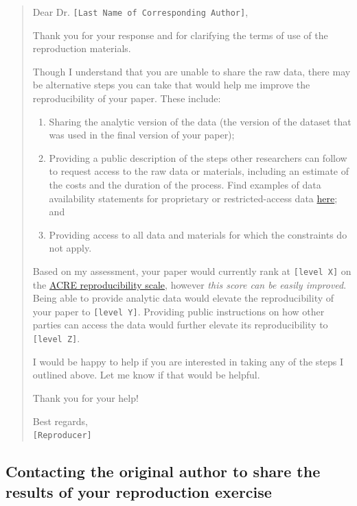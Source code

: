 \documentclass[]{book}
\providecommand{\tightlist}{%
  \setlength{\itemsep}{0pt}\setlength{\parskip}{0pt}}
\begin{document}
\begin{quote}
Dear Dr. \texttt{{[}Last\ Name\ of\ Corresponding\ Author{]}},

Thank you for your response and for clarifying the terms of use of the reproduction materials.

Though I understand that you are unable to share the raw data, there may be alternative steps you can take that would help me improve the reproducibility of your paper. These include:

\begin{enumerate}
\def\labelenumi{\arabic{enumi}.}
\tightlist
\item
  Sharing the analytic version of the data (the version of the dataset that was used in the final version of your paper);\\
\item
  Providing a public description of the steps other researchers can follow to request access to the raw data or materials, including an estimate of the costs and the duration of the process. Find examples of data availability statements for proprietary or restricted-access data \href{https://social-science-data-editors.github.io/guidance/Requested_information_dcas.html}{here}; and\\
\item
  Providing access to all data and materials for which the constraints do not apply.
\end{enumerate}

Based on my assessment, your paper would currently rank at \texttt{{[}level\ X{]}} on the \href{https://bitss.github.io/ACRE/assessment.html\#levels-of-computational-reproducibility-for-a-specific-output}{ACRE reproducibility scale}, however \emph{this score can be easily improved}. Being able to provide analytic data would elevate the reproducibility of your paper to \texttt{{[}level\ Y{]}}. Providing public instructions on how other parties can access the data would further elevate its reproducibility to \texttt{{[}level\ Z{]}}.

I would be happy to help if you are interested in taking any of the steps I outlined above. Let me know if that would be helpful.

Thank you for your help!

Best regards,\\
\texttt{{[}Reproducer{]}}
\end{quote}

\hypertarget{contacting-the-original-author-to-share-the-results-of-your-reproduction-exercise}{%
\subsection{Contacting the original author to share the results of your reproduction exercise}\label{contacting-the-original-author-to-share-the-results-of-your-reproduction-exercise}}
\end{document}
